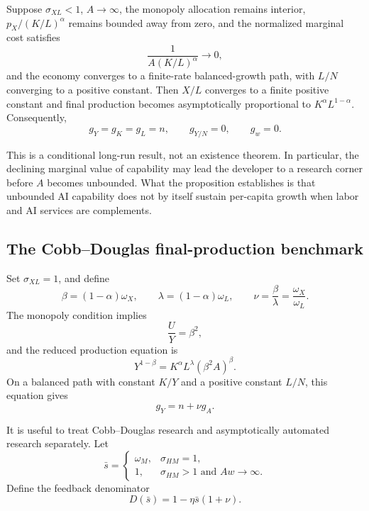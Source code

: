 \begin{proposition}
\label{prop:axm-complements}
Suppose \(\sigma_{XL}<1\), \(A\to\infty\), the monopoly allocation remains
interior, \(p_X/(K/L)^\alpha\) remains bounded away from zero, and the normalized
marginal cost satisfies
\[
 \frac{1}{A(K/L)^\alpha}\to0,
\]
and the economy converges to a finite-rate balanced-growth path, with \(L/N\) converging
to a positive constant. Then \(X/L\) converges to a finite positive constant and
final production becomes asymptotically proportional to
\(K^\alpha L^{1-\alpha}\). Consequently,
\[
 g_Y=g_K=g_L=n,\qquad g_{Y/N}=0,\qquad g_w=0.
\]
\end{proposition}

This is a conditional long-run result, not an existence theorem. In particular,
the declining marginal value of capability may lead the developer to a research
corner before \(A\) becomes unbounded. What the proposition establishes is that
unbounded AI capability does not by itself sustain per-capita growth when labor
and AI services are complements.

\subsection{The Cobb--Douglas final-production benchmark}

Set \(\sigma_{XL}=1\), and define
\begin{equation}
 \beta=(1-\alpha)\omega_X,\qquad
 \lambda=(1-\alpha)\omega_L,\qquad
 \nu=\frac{\beta}{\lambda}=\frac{\omega_X}{\omega_L}.
 \label{eq:axm-cd-definitions}
\end{equation}
The monopoly condition implies
\begin{equation}
 \frac{U}{Y}=\beta^2,
 \label{eq:axm-inference-share-cd}
\end{equation}
and the reduced production equation is
\begin{equation}
 Y^{1-\beta}
 =K^\alpha L^\lambda(\beta^2A)^\beta.
 \label{eq:axm-reduced-cd}
\end{equation}
On a balanced path with constant \(K/Y\) and a positive constant \(L/N\), this
equation gives
\begin{equation}
 g_Y=n+\nu g_A.
 \label{eq:axm-output-growth-cd}
\end{equation}

It is useful to treat Cobb--Douglas research and asymptotically automated research
separately. Let
\begin{equation}
 \bar s=
 \begin{cases}
  \omega_M,&\sigma_{HM}=1,\\
  1,&\sigma_{HM}>1\text{ and }Aw\to\infty.
 \end{cases}
 \label{eq:axm-sbar}
\end{equation}
Define the feedback denominator
\begin{equation}
 D(\bar s)=1-\eta\bar s(1+\nu).
 \label{eq:axm-feedback-denominator}
\end{equation}

